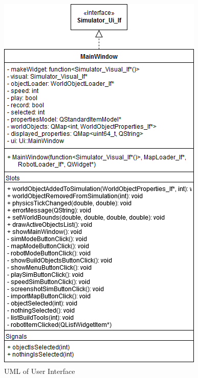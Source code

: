  \begin{figure}
 	\begin{center}
 	\includegraphics[scale=0.5]{./images_design/uml/MainWindow}
 	\caption{UML of User Interface\label{uml:mainwin}}
 	\end{center}
 \end{figure}
 
